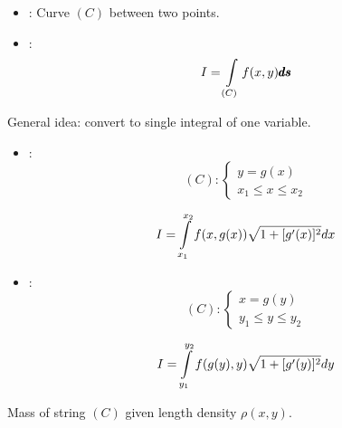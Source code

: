\clearpage

\begin{multicols}{4}


      \begin{itemize}
        \item {}: Curve $(C)$ between two points.
        \item {}:
          \begin{equation*}
            I = \int \limits_{(C)} f(x, y)\pmb{ds}
          \end{equation*}
      \end{itemize}

      \par General idea: convert to single integral of one variable.
        \begin{itemize}
          \item {}:
            \begin{equation*}
              (C):
                \begin{cases}
                  y = g(x) \\
                  x_{1} \leq x \leq x_{2}
                \end{cases}
            \end{equation*}          

            \begin{equation}
              I = \int \limits_{x_{1}}^{x_{2}} f(x, g(x)) \sqrt{1 + [g'(x)]^{2}} dx
            \end{equation}

          \item {}:
            \begin{equation*}
              (C):
                \begin{cases}
                  x = g(y) \\
                  y_{1} \leq y \leq y_{2}
                \end{cases}
            \end{equation*}

            \begin{equation}
              I = \int \limits_{y_{1}}^{y_{2}} f(g(y), y) \sqrt{1 + [g'(y)]^{2}} dy
            \end{equation}

        \end{itemize}

        \par Mass of string $(C)$ given length density $\rho(x, y)$.


\end{multicols}
